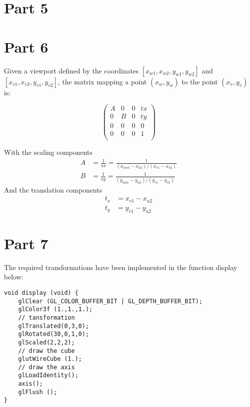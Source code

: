 

\section{Part 5}


\section{Part 6}


Given a viewport defined by the coordinates $[x_{w1},x_{w2},y_{w1},y_{w2}]$ and $[x_{v1},x_{v2},y_{v1},y_{v2}]$,
the matrix mapping a point $(x_{w},y_{w})$ to the point $(x_{v},y_{v})$
 is:


$$
\begin{pmatrix}
    A& 0& 0& tx \\
    0& B& 0& ty \\
    0& 0& 0& 0 \\
    0& 0& 0& 1 \\
\end{pmatrix}
$$

With the scaling components\\
\begin{align*}
    A &= \frac{1}{sx} = \frac{1}{(x_{min}-x_{u2})/(x_{v1}-x_{v2})} \\
    B &= \frac{1}{sy} = \frac{1}{(y_{min}-y_{u2})/(y_{v1}-y_{v2})}
\end{align*}
And the translation components\\
\begin{align*}
   t_x &= x_{v1}-x_{u2} \\
   t_y &= y_{v1}-y_{u2} 
\end{align*}

\section{Part 7}
The required transformations have been implemented in the function display below:
\begin{lstlisting}[caption=Snapshot from Part7.cpp]
void display (void) {
    glClear (GL_COLOR_BUFFER_BIT | GL_DEPTH_BUFFER_BIT);
    glColor3f (1.,1.,1.);
    // tansformation
    glTranslated(0,3,0);
    glRotated(30,0,1,0);
    glScaled(2,2,2);
    // draw the cube
    glutWireCube (1.);
    // draw the axis 
    glLoadIdentity();
    axis();
    glFlush ();
}
\end{lstlisting}

